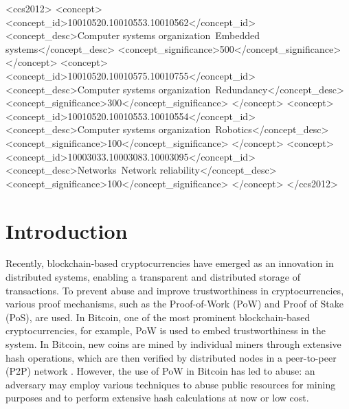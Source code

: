 \documentclass[acmlarge]{acmart}
\newcommand{\bcc}{{blockchain}\xspace}
\begin{document}
\begin{CCSXML}
<ccs2012>
 <concept>
  <concept_id>10010520.10010553.10010562</concept_id>
  <concept_desc>Computer systems organization~Embedded systems</concept_desc>
  <concept_significance>500</concept_significance>
 </concept>
 <concept>
  <concept_id>10010520.10010575.10010755</concept_id>
  <concept_desc>Computer systems organization~Redundancy</concept_desc>
  <concept_significance>300</concept_significance>
 </concept>
 <concept>
  <concept_id>10010520.10010553.10010554</concept_id>
  <concept_desc>Computer systems organization~Robotics</concept_desc>
  <concept_significance>100</concept_significance>
 </concept>
 <concept>
  <concept_id>10003033.10003083.10003095</concept_id>
  <concept_desc>Networks~Network reliability</concept_desc>
  <concept_significance>100</concept_significance>
 </concept>
</ccs2012>
\end{CCSXML}


\maketitle


\section{Introduction}\label{sec:introduction}
Recently, \bcc-based cryptocurrencies have emerged as an innovation in distributed systems, enabling a transparent and distributed storage of transactions. To prevent abuse and improve trustworthiness in cryptocurrencies, various proof mechanisms, such as the Proof-of-Work (PoW) and Proof of Stake (PoS), are used. In Bitcoin, one of the most prominent blockchain-based cryptocurrencies, for example, PoW is used to embed  trustworthiness in the system. In Bitcoin, new coins are mined by individual miners through extensive hash operations, which are then verified by distributed nodes in a peer-to-peer (P2P) network . However, the use of PoW in Bitcoin has led to abuse: an adversary may employ various techniques to abuse public resources for mining purposes and to perform extensive hash calculations at now or low cost. 
\end{document}
